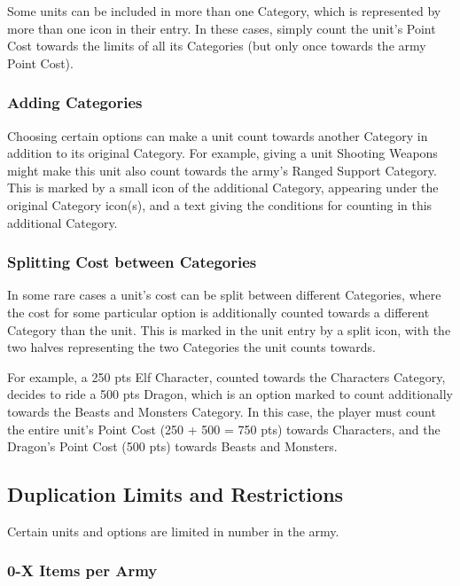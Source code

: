 Some units can be included in more than one Category, which is represented by more than one icon in their entry. In these cases, simply count the unit's Point Cost towards the limits of all its Categories (but only once towards the army Point Cost).

\subsubsection{Adding Categories}

Choosing certain options can make a unit count towards another Category in addition to its original Category. For example, giving a unit Shooting Weapons might make this unit also count towards the army's Ranged Support Category. This is marked by a small icon of the additional Category, appearing under the original Category icon(s), and a text giving the conditions for counting in this additional Category.

\subsubsection{Splitting Cost between Categories}

In some rare cases a unit's cost can be split between different Categories, where the cost for some particular option is additionally counted towards a different Category than the unit. This is marked in the unit entry by a split icon, with the two halves representing the two Categories the unit counts towards.

For example, a 250 pts Elf Character, counted towards the Characters Category, decides to ride a 500 pts Dragon, which is an option marked to count additionally towards the Beasts and Monsters Category. In this case, the player must count the entire unit's Point Cost (250 + 500 = 750 pts) towards Characters, and the Dragon's Point Cost (500 pts) towards Beasts and Monsters.

\subsection{Duplication Limits and Restrictions}
\label{duplication_limits}

Certain units and options are limited in number in the army.

\subsubsection{0-X Items per Army}

